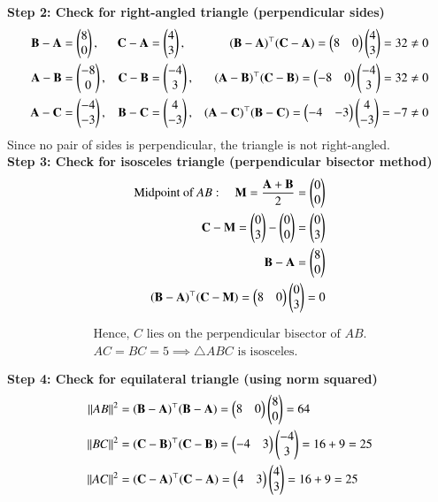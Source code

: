 \documentclass[journal]{IEEEtran}
\begin{document}
\textbf{Step 2: Check for right-angled triangle (perpendicular sides)}
\begin{align}
\mathbf{B}-\mathbf{A} &= \begin{pmatrix}8\\0\end{pmatrix}, &
\mathbf{C}-\mathbf{A} &= \begin{pmatrix}4\\3\end{pmatrix}, &
(\mathbf{B}-\mathbf{A})^\top (\mathbf{C}-\mathbf{A}) = \begin{pmatrix}8&0\end{pmatrix}\begin{pmatrix}4\\3\end{pmatrix} = 32 \neq 0 \\
\mathbf{A}-\mathbf{B} &= \begin{pmatrix}-8\\0\end{pmatrix}, &
\mathbf{C}-\mathbf{B} &= \begin{pmatrix}-4\\3\end{pmatrix}, &
(\mathbf{A}-\mathbf{B})^\top (\mathbf{C}-\mathbf{B}) = \begin{pmatrix}-8&0\end{pmatrix}\begin{pmatrix}-4\\3\end{pmatrix} = 32 \neq 0 \\
\mathbf{A}-\mathbf{C} &= \begin{pmatrix}-4\\-3\end{pmatrix}, &
\mathbf{B}-\mathbf{C} &= \begin{pmatrix}4\\-3\end{pmatrix}, &
(\mathbf{A}-\mathbf{C})^\top (\mathbf{B}-\mathbf{C}) = \begin{pmatrix}-4&-3\end{pmatrix}\begin{pmatrix}4\\-3\end{pmatrix} = -7 \neq 0
\end{align}
Since no pair of sides is perpendicular, the triangle is not right-angled.\\
\textbf{Step 3: Check for isosceles triangle (perpendicular bisector method)}
\begin{align}
\text{Midpoint of } AB: \quad \mathbf{M} = \frac{\mathbf{A}+\mathbf{B}}{2} = \begin{pmatrix}0\\0\end{pmatrix} \\
\mathbf{C}-\mathbf{M} = \begin{pmatrix}0\\3\end{pmatrix}-\begin{pmatrix}0\\0\end{pmatrix} = \begin{pmatrix}0\\3\end{pmatrix} \\
\mathbf{B}-\mathbf{A} = \begin{pmatrix}8\\0\end{pmatrix} \\
(\mathbf{B}-\mathbf{A})^\top (\mathbf{C}-\mathbf{M}) = \begin{pmatrix}8&0\end{pmatrix}\begin{pmatrix}0\\3\end{pmatrix} = 0
\end{align}


\begin{align*}
\text{Hence, } C \text{ lies on the perpendicular bisector of } AB.\\
AC = BC = 5 \implies \triangle ABC \text{ is isosceles.}
\end{align*}


\textbf{Step 4: Check for equilateral triangle (using norm squared)}
\begin{align}
\left\lVert AB\right\rVert^2 &= (\mathbf{B}-\mathbf{A})^\top (\mathbf{B}-\mathbf{A}) = \begin{pmatrix}8&0\end{pmatrix}\begin{pmatrix}8\\0\end{pmatrix} = 64 \\
\left\lVert BC\right\rVert^2 &= (\mathbf{C}-\mathbf{B})^\top (\mathbf{C}-\mathbf{B}) = \begin{pmatrix}-4&3\end{pmatrix}\begin{pmatrix}-4\\3\end{pmatrix} = 16 + 9 = 25 \\
\left\lVert AC\right\rVert^2 &= (\mathbf{C}-\mathbf{A})^\top (\mathbf{C}-\mathbf{A}) = \begin{pmatrix}4&3\end{pmatrix}\begin{pmatrix}4\\3\end{pmatrix} = 16 + 9 = 25
\end{align}
\end{document}
